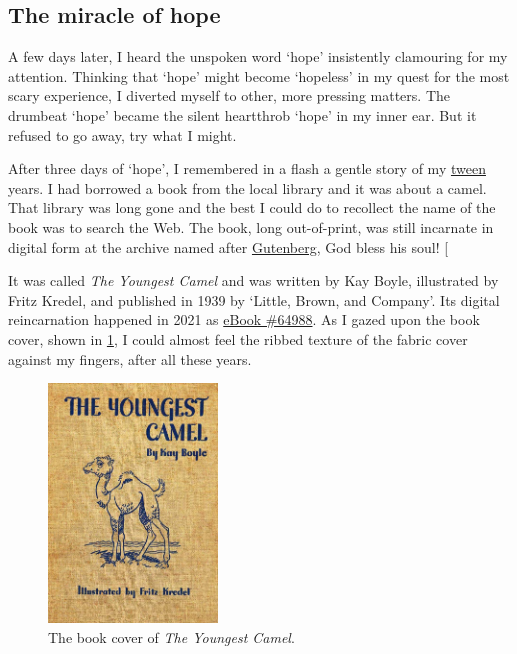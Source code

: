 \documentclass[
  a4paper,
]{article}
\begin{document}
\subsection{The miracle of hope}\label{the-miracle-of-hope}

A few days later, I heard the unspoken word `hope' insistently
clamouring for my attention. Thinking that `hope' might become
`hopeless' in my quest for the most scary experience, I diverted myself
to other, more pressing matters. The drumbeat `hope' became the silent
heartthrob `hope' in my inner ear. But it refused to go away, try what I
might.

After three days of `hope', I remembered in a flash a gentle story of my
\href{https://www.thefreedictionary.com/tween}{tween} years. I had
borrowed a book from the local library and it was about a camel. That
library was long gone and the best I could do to recollect the name of
the book was to search the Web. The book, long out-of-print, was still
incarnate in digital form at the archive named after
\href{https://www.newworldencyclopedia.org/entry/Johannes_Gutenberg}{Gutenberg},
God bless his soul! {[}\citeproc{ref-boyle1939}{1}{]}

It was called \emph{The Youngest Camel} and was written by Kay Boyle,
illustrated by Fritz Kredel, and published in 1939 by `Little, Brown,
and Company'. Its digital reincarnation happened in 2021 as
\href{https://www.gutenberg.org/files/64988/64988-h/64988-h.htm}{eBook
\#64988}. As I gazed upon the book cover, shown in \cref{fig:camel}, I
could almost feel the ribbed texture of the fabric cover against my
fingers, after all these years.

\begin{figure}
\centering
\includegraphics[width=0.4\textwidth,height=\textheight]{images/camel.jpg}
\caption{The book cover of \emph{The Youngest Camel}.}\label{fig:camel}
\end{figure}
\end{document}

